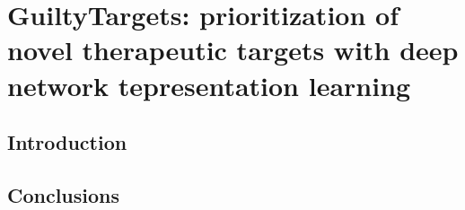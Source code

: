 \chapter{GuiltyTargets: prioritization of novel therapeutic targets with deep network tepresentation learning}\label{chap:guiltytargets}

\section*{Introduction}

\vspace*{\fill}



\section*{Conclusions}
